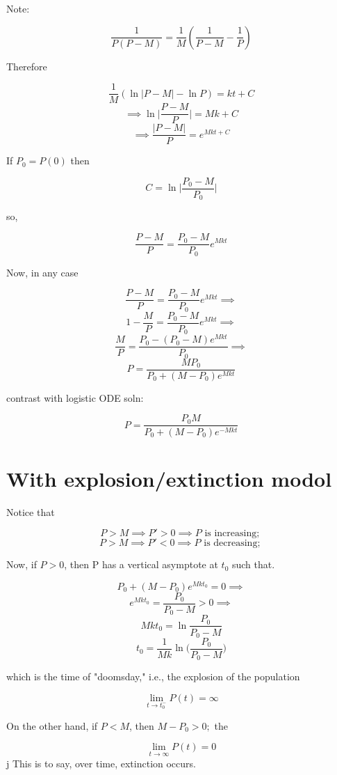 \documentclass[10pt,a4paper]{article}
\theoremstyle{definition}
\begin{document}
  Note:

  \[ \frac{1}{P(P-M)} = \frac{1}{M}( \frac{1}{P-M}- \frac{1}{P}) \]

  Therefore 

  \[ \frac{1}{M}( \ln|P-M| - \ln P ) = kt + C \]
  \[ \implies \ln  \bigg| \frac{P-M}{P}\bigg| = Mk + C \]
  \[ \implies \frac{|P-M|}{P} = e^{Mkt+C} \]

  If \( P_0 = P(0) \) then 

  \[ C = \ln \bigg|\frac{P_0-M}{P_0}\bigg| \]

  so,

  \[ \frac{P-M}{P} = \frac{P_0-M}{P_0}e^{Mkt} \]

  Now, in any case 

  \[ \frac{P-M}{P} = \frac{P_0 - M}{P_0}e^{Mkt} \implies \]
  \[ 1 - \frac{M}{P} = \frac{P_0-M}{P_0}e^{Mkt} \implies  \]
  \[ \frac{M}{P} = \frac{P_0- (P_0 -M) e^{Mkt} }{P_0} \implies  \]
  \[ \boxed{P = \frac{MP_0}{P_0 + (M-P_0)e^{Mkt}} } \]

  contrast with logistic ODE soln: 

  \[ P = \frac{P_0M}{P_0 + (M-P_0)e^{-Mkt}} \]


  \newpage
\section*{With explosion/extinction modol}

  Notice that 

  \[ P>M \implies P'>0 \implies P \text{ is increasing; } \]
  \[ P>M \implies P'<0 \implies P \text{ is decreasing; } \]

  Now, if \( P>0 \), then P has a vertical 
  asymptote at \( t_0 \) such that. 

  \[ P_0 + (M-P_0)e^{Mkt_0} = 0 \implies \]
  \[ e^{Mkt_0} = \frac{P_0}{P_0 - M}>0 \implies \]
  \[ Mkt_0 = \ln \frac{P_0}{P_0-M} \]
  \[ \boxed{t_0 = \frac{1}{Mk} \ln \bigg( \frac{P_0}{P_0-M} \bigg)} \]

  which is the time of "doomsday," i.e., the explosion of the population 

  \[ \lim_{t \to t_0^-} P(t) = \infty \]

  On the other hand, if \( P<M \), then \( M-P_0>0; \) the

  \[ \lim_{t \to \infty} P(t) = 0 \]
  j
  This is to say, over time, extinction occurs. 
\end{document}
